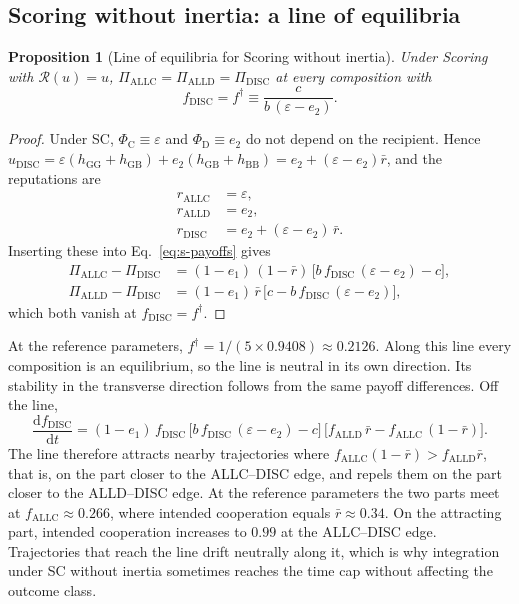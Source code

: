 \documentclass[10pt]{wlscirep}
\newcommand{\Rmap}{\mathscr{R}}            %
\newcommand{\PhiC}{\Phi_{\mathrm{C}}}
\newcommand{\PhiD}{\Phi_{\mathrm{D}}}
\newcommand{\dd}{\mathrm{d}}
\newcommand{\ALLC}{\mathrm{ALLC}}
\newcommand{\ALLD}{\mathrm{ALLD}}
\newcommand{\DISC}{\mathrm{DISC}}
\theoremstyle{plain}
\newtheorem{proposition}[lemma]{Proposition}
\theoremstyle{remark}
\begin{document}
\subsection{Scoring without inertia: a line of equilibria}

\begin{proposition}[Line of equilibria for Scoring without inertia]\label{prop:neutral}
Under Scoring with $\Rmap(u)=u$, $\Pi_{\ALLC}=\Pi_{\ALLD}=\Pi_{\DISC}$ at every composition with
\begin{equation}
f_{\DISC}=f^\dagger\equiv\frac{c}{b\,(\varepsilon-e_2)}.
\label{eq:s-fdagger}
\end{equation}
\end{proposition}
\begin{proof}
Under SC, $\PhiC\equiv\varepsilon$ and $\PhiD\equiv e_2$ do not depend on the recipient. Hence $u_{\DISC}=\varepsilon(h_{\mathrm{GG}}+h_{\mathrm{GB}})+e_2(h_{\mathrm{GB}}+h_{\mathrm{BB}})=e_2+(\varepsilon-e_2)\bar r$, and the reputations are
\begin{equation}
\begin{aligned}
r_{\ALLC}&=\varepsilon,\\
r_{\ALLD}&=e_2,\\
r_{\DISC}&=e_2+(\varepsilon-e_2)\,\bar r.
\end{aligned}
\label{eq:s-sc-reputations}
\end{equation}
Inserting these into Eq.~\eqref{eq:s-payoffs} gives
\begin{equation}
\begin{aligned}
\Pi_{\ALLC}-\Pi_{\DISC}&=(1-e_1)\,(1-\bar r)\,\bigl[b\,f_{\DISC}\,(\varepsilon-e_2)-c\bigr],\\
\Pi_{\ALLD}-\Pi_{\DISC}&=(1-e_1)\,\bar r\,\bigl[c-b\,f_{\DISC}\,(\varepsilon-e_2)\bigr],
\end{aligned}
\label{eq:s-sc-payoffs}
\end{equation}
which both vanish at $f_{\DISC}=f^\dagger$.
\end{proof}

At the reference parameters, $f^\dagger=1/(5\times0.9408)\approx0.2126$. Along this line every composition is an equilibrium, so the line is neutral in its own direction. Its stability in the transverse direction follows from the same payoff differences. Off the line,
\begin{equation}
\frac{\dd f_{\DISC}}{\dd t}=(1-e_1)\,f_{\DISC}\,\bigl[b\,f_{\DISC}\,(\varepsilon-e_2)-c\bigr]\,\bigl[f_{\ALLD}\,\bar r-f_{\ALLC}\,(1-\bar r)\bigr].
\label{eq:s-sc-transverse}
\end{equation}
The line therefore attracts nearby trajectories where $f_{\ALLC}(1-\bar r)>f_{\ALLD}\bar r$, that is, on the part closer to the ALLC--DISC edge, and repels them on the part closer to the ALLD--DISC edge. At the reference parameters the two parts meet at $f_{\ALLC}\approx0.266$, where intended cooperation equals $\bar r\approx0.34$. On the attracting part, intended cooperation increases to $0.99$ at the ALLC--DISC edge. Trajectories that reach the line drift neutrally along it, which is why integration under SC without inertia sometimes reaches the time cap without affecting the outcome class.
\end{document}
